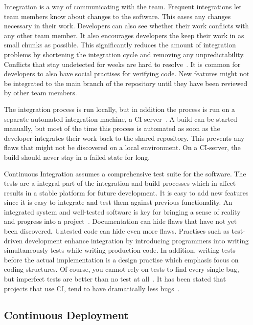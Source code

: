 \documentclass[english]{tktltiki2}
\begin{document}
Integration is a way of communicating with the team. Frequent integrations let team members know about changes to the software. This eases any changes necessary in their work. Developers can also see whether their work conflicts with any other team member. It also encourages developers the keep their work in as small chunks as possible. This significantly reduces the amount of integration problems by shortening the integration cycle and removing any unpredictability. Conflicts that stay undetected for weeks are hard to resolve~\cite{Fow06}. It is common for developers to also have social practises for verifying code. New features might not be integrated to the main branch of the repository until they have been reviewed by other team members.

The integration process is run locally, but in addition the process is run on a separate automated integration machine, a CI-server~\cite{Fow06}. A build can be started manually, but most of the time this process is automated as soon as the developer integrates their work back to the shared repository. This prevents any flaws that might not be discovered on a local environment. On a CI-server, the build should never stay in a failed state for long.

Continuous Integration assumes a comprehensive test suite for the software. The tests are a integral part of the integration and build processes which in affect results in a stable platform for future development. It is easy to add new features since it is easy to integrate and test them against previous functionality. An integrated system and well-tested software is key for bringing a sense of reality and progress into a project~\cite{Fow05}. Documentation can hide flaws that have not yet been discovered. Untested code can hide even more flaws. Practises such as test-driven development enhance integration by introducing programmers into writing simultaneously tests while writing production code. In addition, writing tests before the actual implementation is a design practise which emphasis focus on coding structures. Of course, you cannot rely on tests to find every single bug, but imperfect tests are better than no test at all~\cite{Fow06}. It has been stated that projects that use CI, tend to have dramatically less bugs~\cite{Fow06}.

\subsection{Continuous Deployment}
\end{document}
